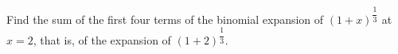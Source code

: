 Find the sum of the first four terms of the binomial expansion of $(1+x)^{\dfrac{1}{3}}$ at $x=2$, that is, of the expansion of $(1+2)^{\dfrac{1}{3}}$.
